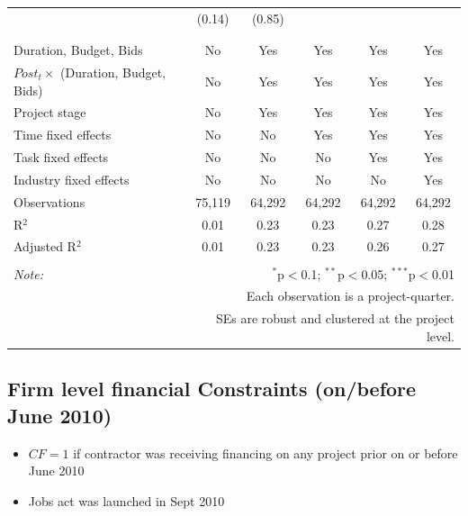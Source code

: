 \documentclass[
]{article}
\providecommand{\tightlist}{%
  \setlength{\itemsep}{0pt}\setlength{\parskip}{0pt}}
\begin{document}
\begin{table}[H]
\begin{tabular}{@{\extracolsep{-2pt}}lccccc}
  & (0.14) & (0.85) &  &  &  \\ 
  & & & & & \\ 
\hline \\[-1.8ex] 
Duration, Budget, Bids & No & Yes & Yes & Yes & Yes \\ 
$Post_t \times $  (Duration, Budget, Bids) & No & Yes & Yes & Yes & Yes \\ 
Project stage & No & Yes & Yes & Yes & Yes \\ 
Time fixed effects & No & No & Yes & Yes & Yes \\ 
Task fixed effects & No & No & No & Yes & Yes \\ 
Industry fixed effects & No & No & No & No & Yes \\ 
Observations & 75,119 & 64,292 & 64,292 & 64,292 & 64,292 \\ 
R$^{2}$ & 0.01 & 0.23 & 0.23 & 0.27 & 0.28 \\ 
Adjusted R$^{2}$ & 0.01 & 0.23 & 0.23 & 0.26 & 0.27 \\ 
\hline 
\hline \\[-1.8ex] 
\textit{Note:}  & \multicolumn{5}{r}{$^{*}$p$<$0.1; $^{**}$p$<$0.05; $^{***}$p$<$0.01} \\ 
 & \multicolumn{5}{r}{Each observation is a project-quarter.} \\ 
 & \multicolumn{5}{r}{SEs are robust and clustered at the project level.} \\ 
\end{tabular} 
\end{table}

\hypertarget{firm-level-financial-constraints-onbefore-june-2010}{%
\subsection{Firm level financial Constraints (on/before June
2010)}\label{firm-level-financial-constraints-onbefore-june-2010}}

\begin{itemize}
\tightlist
\item
  \(CF=1\) if contractor was receiving financing on any project prior on
  or before June 2010
\item
  Jobs act was launched in Sept 2010
\end{itemize}
\end{document}
